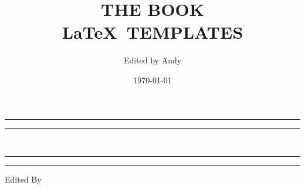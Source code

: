 \documentclass[openany,twoside,12pt]{book}
\title{THE BOOK \\[8pt] \LaTeX ~TEMPLATES}
\author{Edited by Andy}
\date{\today}
\theoremstyle{plain}
\numberwithin{equation}{chapter}
\numberwithin{figure}{chapter}
\numberwithin{table}{chapter}
\begin{document}




\begin{titlepage} %


  \centering %

  \scshape %

  \vspace*{2\baselineskip} %


  \rule{\textwidth}{1.6pt}\vspace*{-\baselineskip}\vspace*{2pt} %
  \rule{\textwidth}{0.4pt} %

  \vspace{0.75\baselineskip} %

  {\LARGE\bfseries \makeatletter\@title\makeatother \\} %

  \vspace{0.75\baselineskip} %

  \rule{\textwidth}{0.4pt}\vspace*{-\baselineskip}\vspace{3.2pt} %
  \rule{\textwidth}{1.6pt} %

  \vspace{5\baselineskip} %


  Edited By

  \vspace{0.5\baselineskip} %

  {\scshape\Large \makeatletter\@author\makeatother} %


\end{titlepage}
\end{document}
